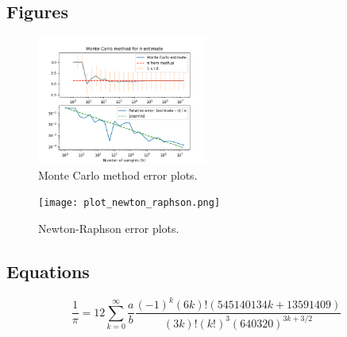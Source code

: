 \documentclass[11pt]{article}
\begin{document}
\subsection*{Figures}
\begin{figure}[h!]
    \centering
    \includegraphics[width=0.5\textwidth]{monte_carlo_plot.png}
    \caption{Monte Carlo method error plots.}
    \label{fig:monte_carlo_plot}
\end{figure}
\begin{figure}[h]
    \centering
    \texttt{[image: plot\_newton\_raphson.png]}
    \caption{Newton-Raphson error plots.}
    \label{fig:newton-raphson_plot}
\end{figure}
\subsection*{Equations}
\begin{equation}
    \label{eq:chudnovsky}
    \frac{1}{\pi} =  12\sum_{k=0}^{\infty}\frac{a}{b} \frac{(-1)^k(6k)!(545140134k+13591409)}{(3k)!(k!)^3(640320)^{3k+3/2}}
\end{equation}
\end{document}
